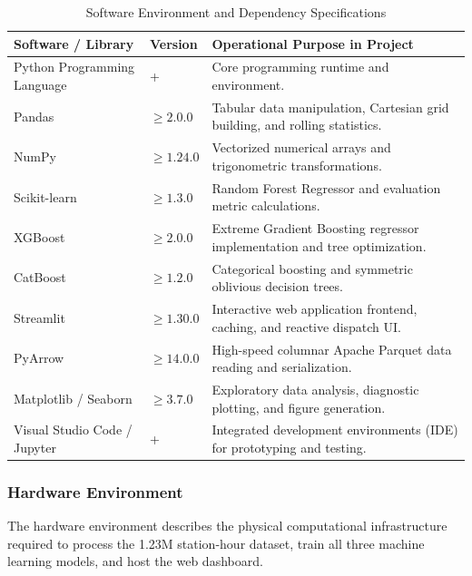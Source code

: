 \documentclass[12pt, a4paper]{article}
\renewcommand{\_}{\textunderscore\allowbreak}
\begin{document}
\begin{table}[H]
\centering
\small
\renewcommand{\arraystretch}{1.25}
\begin{tabularx}{\textwidth}{|>{\raggedright\arraybackslash}p{3.8cm}|>{\centering\arraybackslash}p{2.0cm}|>{\raggedright\arraybackslash}X|}
\hline
\textbf{Software / Library} & \textbf{Version} & \textbf{Operational Purpose in Project} \\ \hline
Python Programming Language & 3.10+ & Core programming runtime and environment. \\ \hline
Pandas & $\ge 2.0.0$ & Tabular data manipulation, Cartesian grid building, and rolling statistics. \\ \hline
NumPy & $\ge 1.24.0$ & Vectorized numerical arrays and trigonometric transformations. \\ \hline
Scikit-learn & $\ge 1.3.0$ & Random Forest Regressor and evaluation metric calculations. \\ \hline
XGBoost & $\ge 2.0.0$ & Extreme Gradient Boosting regressor implementation and tree optimization. \\ \hline
CatBoost & $\ge 1.2.0$ & Categorical boosting and symmetric oblivious decision trees. \\ \hline
Streamlit & $\ge 1.30.0$ & Interactive web application frontend, caching, and reactive dispatch UI. \\ \hline
PyArrow & $\ge 14.0.0$ & High-speed columnar Apache Parquet data reading and serialization. \\ \hline
Matplotlib / Seaborn & $\ge 3.7.0$ & Exploratory data analysis, diagnostic plotting, and figure generation. \\ \hline
Visual Studio Code / Jupyter & 2024+ & Integrated development environments (IDE) for prototyping and testing. \\ \hline
\end{tabularx}
\caption{Software Environment and Dependency Specifications}
\label{tab:software_env}
\end{table}

\subsubsection{Hardware Environment}

The hardware environment describes the physical computational infrastructure required to process the 1.23M station-hour dataset, train all three machine learning models, and host the web dashboard.
\end{document}
